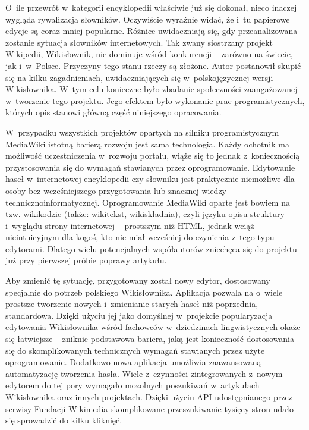 \documentclass{pracamgr}
\begin{document}
O~ile przewrót w~kategorii encyklopedii właściwie już się dokonał, nieco inaczej wygląda rywalizacja słowników. Oczywiście wyraźnie widać, że i~tu papierowe edycje są coraz mniej popularne. Różnice uwidaczniają się, gdy przeanalizowana zostanie sytuacja słowników internetowych. Tak zwany siostrzany projekt Wikipedii, Wikisłownik, nie dominuje wśród konkurencji -- zarówno na świecie, jak i~w~Polsce. Przyczyny tego stanu rzeczy są złożone. Autor postanowił skupić się na kilku zagadnieniach, uwidaczniających się w~polskojęzycznej wersji Wikisłownika. W~tym celu konieczne było zbadanie społeczności zaangażowanej w~tworzenie tego projektu. Jego efektem było wykonanie prac programistycznych, których opis stanowi główną część niniejszego opracowania.

W~przypadku wszystkich projektów opartych na silniku programistycznym MediaWiki istotną barierą rozwoju jest sama technologia. Każdy ochotnik ma możliwość uczestniczenia w~rozwoju portalu, wiąże się to jednak z~koniecznością przystosowania się do wymagań stawianych przez oprogramowanie. Edytowanie haseł w~internetowej encyklopedii czy słowniku jest praktycznie niemożliwe dla osoby bez wcześniejszego przygotowania lub znacznej wiedzy techniczno\dywiz{}informatycznej. Oprogramowanie MediaWiki oparte jest bowiem na tzw. wikikodzie (także: wikitekst, wikiskładnia), czyli języku opisu struktury i~wyglądu strony internetowej -- prostszym niż HTML, jednak wciąż nieintuicyjnym dla kogoś, kto nie miał wcześniej do czynienia z~tego typu edytorami. Dlatego wielu potencjalnych współautorów zniechęca się do projektu już przy pierwszej próbie poprawy artykułu.

Aby zmienić tę sytuację, przygotowany został nowy edytor, dostosowany specjalnie do potrzeb polskiego Wikisłownika. Aplikacja pozwala na o~wiele prostsze tworzenie nowych i~zmienianie starych haseł niż poprzednia, standardowa. Dzięki użyciu jej jako domyślnej w~projekcie popularyzacja edytowania Wikisłownika wśród fachowców w~dziedzinach lingwistycznych okaże się łatwiejsze -- zniknie podstawowa bariera, jaką jest konieczność dostosowania się do skomplikowanych technicznych wymagań stawianych przez użyte oprogramowanie. Dodatkowo nowa aplikacja umożliwia zaawansowaną automatyzację tworzenia hasła. Wiele z~czynności zintegrowanych z~nowym edytorem do tej pory wymagało mozolnych poszukiwań w~artykułach Wikisłownika oraz innych projektach. Dzięki użyciu API udostępnianego przez serwisy Fundacji Wikimedia skomplikowane przeszukiwanie tysięcy stron udało się sprowadzić do kilku kliknięć.
\end{document}
